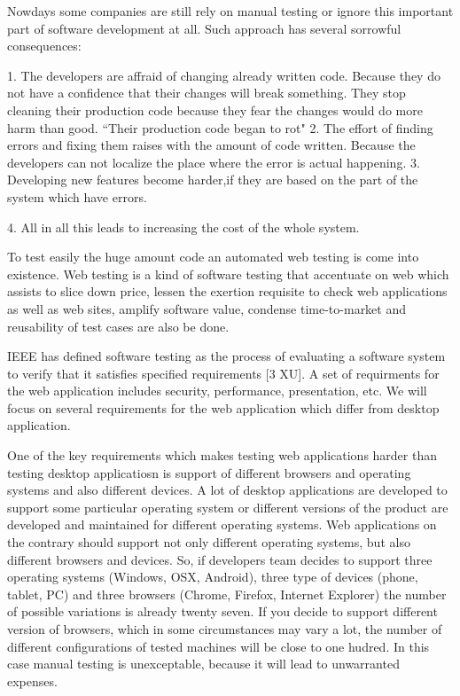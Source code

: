 		Nowdays some companies are still rely on manual testing or ignore this
		important part of software development at all. Such approach has several
		sorrowful consequences:
		
		1. The developers are affraid of changing already written
		code. Because they do not have a confidence that their changes will break something. They
			stop cleaning their production code because they fear the changes would
			do more harm than good. ``Their production code began to rot"
			\cite[p.123]{cleanCode} 
		2. The effort of finding errors and
			fixing them raises with the amount of code written. Because the developers can not localize the place where the error is
		actual happening.
		3. Developing new features become harder,if they are based on the part of the
		system which have errors.
		
		4. All in all this leads to increasing the cost of the whole system.
	 	
	 	 To test easily the huge amount code an automated web testing is come into
	 	 existence.
	 	 Web testing is a kind of software testing that accentuate on web which assists to slice down price,
	     lessen the exertion requisite to check web applications as well as web
	      sites, amplify software value, condense time-to-market and reusability of
	      test cases are also be done.
	   
		IEEE has defined software testing as the process of evaluating a software
		system to verify that it satisfies specified requirements [3 XU]. A set of
		requirments for the web application includes security, performance,
		presentation, etc. We will focus on several requirements for the web
		application which differ from desktop application. 
		
		One of the key requirements which makes testing web applications harder than
		testing desktop applicatiosn is support of different browsers and operating systems and also
		different devices. A lot of desktop applications are developed to support some
		particular operating system or different versions of the product are developed
		and maintained for different operating systems. Web applications on the
		contrary should support not only different operating systems, but also
		different browsers and devices. So, if developers team decides to support
		three operating systems (Windows, OSX, Android), three type of devices (phone,
		tablet, PC) and three browsers (Chrome, Firefox, Internet Explorer) the number
		of possible variations is already twenty seven. If you decide to support
		different version of browsers, which in some circumstances may vary a lot,
		the number of different configurations of tested machines will be close to
		one hudred. In this case manual testing is unexceptable, because it will lead
		to unwarranted expenses. 
		
